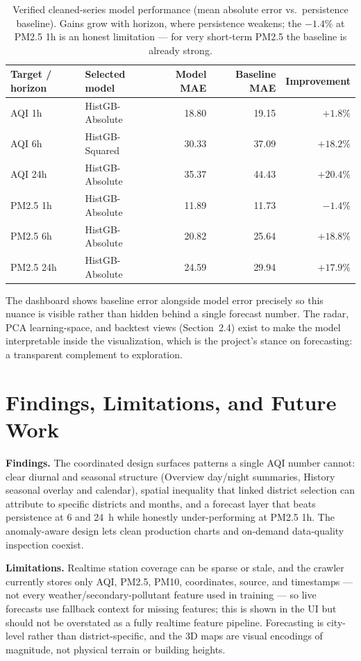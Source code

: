 \documentclass[a4paper]{article}
\begin{document}
\begin{table}[h]
\centering
\small
\begin{tabular}{@{}llrrr@{}}
\toprule
Target / horizon & Selected model & Model MAE & Baseline MAE & Improvement \\
\midrule
AQI 1h    & HistGB-Absolute & 18.80 & 19.15 & $+1.8\%$ \\
AQI 6h    & HistGB-Squared  & 30.33 & 37.09 & $+18.2\%$ \\
AQI 24h   & HistGB-Absolute & 35.37 & 44.43 & $+20.4\%$ \\
PM2.5 1h  & HistGB-Absolute & 11.89 & 11.73 & $-1.4\%$ \\
PM2.5 6h  & HistGB-Absolute & 20.82 & 25.64 & $+18.8\%$ \\
PM2.5 24h & HistGB-Absolute & 24.59 & 29.94 & $+17.9\%$ \\
\bottomrule
\end{tabular}
\caption{Verified cleaned-series model performance (mean absolute error vs.\ persistence baseline). Gains
grow with horizon, where persistence weakens; the $-1.4\%$ at PM2.5 1h is an honest limitation --- for very
short-term PM2.5 the baseline is already strong.}
\label{tab:model}
\end{table}

The dashboard shows baseline error alongside model error precisely so this nuance is visible rather than
hidden behind a single forecast number. The radar, PCA learning-space, and backtest views (Section~2.4)
exist to make the model interpretable inside the visualization, which is the project's stance on
forecasting: a transparent complement to exploration.

\section{Findings, Limitations, and Future Work}
\textbf{Findings.} The coordinated design surfaces patterns a single AQI number cannot: clear diurnal and
seasonal structure (Overview day/night summaries, History seasonal overlay and calendar), spatial
inequality that linked district selection can attribute to specific districts and months, and a forecast
layer that beats persistence at 6 and 24~h while honestly under-performing at PM2.5 1h. The anomaly-aware
design lets clean production charts and on-demand data-quality inspection coexist.

\textbf{Limitations.} Realtime station coverage can be sparse or stale, and the crawler currently stores
only AQI, PM2.5, PM10, coordinates, source, and timestamps --- not every weather/secondary-pollutant
feature used in training --- so live forecasts use fallback context for missing features; this is shown in
the UI but should not be overstated as a fully realtime feature pipeline. Forecasting is city-level rather
than district-specific, and the 3D maps are visual encodings of magnitude, not physical terrain or
building heights.
\end{document}
